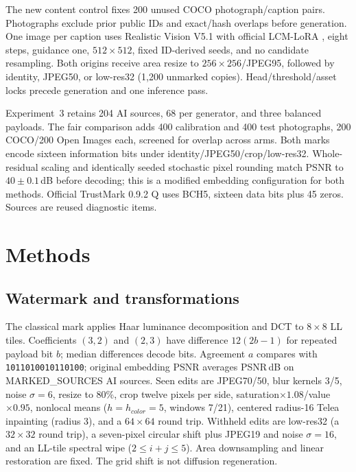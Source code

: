 \documentclass[conference]{IEEEtran}
\begin{document}
The new content control fixes 200 unused COCO photograph/caption pairs.
Photographs exclude prior public IDs and exact/hash overlaps before generation.
One image per caption uses Realistic Vision V5.1 with official
LCM-LoRA \cite{lcm}, eight steps, guidance one, $512\times512$, fixed
ID-derived seeds, and no candidate resampling. Both origins receive area
resize to $256\times256$/JPEG95, followed by identity, JPEG50, or low-res32 (1,200 unmarked
copies). Head/threshold/asset locks precede generation and one inference pass.

Experiment~3 retains 204 AI sources, 68 per generator, and three balanced
payloads. The fair comparison adds 400 calibration and 400 test photographs,
200 COCO/200 Open Images each, screened for overlap across arms.
Both marks encode sixteen information bits under identity/JPEG50/crop/low-res32.
Whole-residual scaling and identically seeded stochastic pixel rounding
match PSNR to $40\pm0.1$\,dB before decoding; this is a modified embedding
configuration for both methods. Official TrustMark 0.9.2 Q uses BCH5,
sixteen data bits plus 45 zeros. Sources are reused diagnostic items.

\section{Methods}
\subsection{Watermark and transformations}
The classical mark applies Haar luminance decomposition and DCT to
$8\times8$ LL tiles. Coefficients $(3,2)$ and $(2,3)$ have difference
$12(2b-1)$ for repeated payload bit $b$; median differences decode bits.
Agreement $a$ compares with \texttt{1011010010110100}; original embedding
PSNR averages {{PSNR}}\,dB on {{MARKED_SOURCES}} AI sources.
Seen edits are JPEG70/50, blur kernels 3/5, noise $\sigma=6$, resize to 80\%,
crop twelve pixels per side, saturation$\times1.08$/value$\times0.95$,
nonlocal means ($h=h_{color}=5$, windows 7/21), centered radius-16 Telea
inpainting (radius 3), and a $64\times64$ round trip.
Withheld edits are low-res32 (a $32\times32$ round trip), a seven-pixel circular shift plus JPEG19 and
noise $\sigma=16$, and an LL-tile spectral wipe ($2\le i+j\le5$).
Area downsampling and linear restoration are fixed. The grid shift is not
diffusion regeneration.
\end{document}
